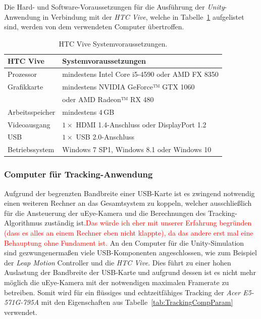 Die Hard- und Software-Voraussetzungen für die Ausführung der \textit{Unity}-Anwendung in Verbindung mit der \textit{HTC Vive}, welche in Tabelle~\ref{tab:viveReq} aufgelistet sind, werden von dem verwendeten Computer übertroffen.

\begin{table}
	\centering
	\begin{tabular}{|l|l|}
		\hline
		\Absatzbox{}
		\textbf{HTC Vive}& \textbf{Systemvoraussetzungen} \\
		\hline
		Prozessor & mindestens Intel Core i5-4590 oder AMD FX 8350\\
		\hline
		Grafikkarte & mindestens NVIDIA GeForce™ GTX 1060\\
		&oder AMD Radeon™ RX 480\\
		\hline
		Arbeitsspeicher & mindestens $4\,$GB\\		
		\hline
		Videoausgang & $1\times$ HDMI 1.4-Anschluss oder DisplayPort 1.2\\
		\hline
		USB & $1\times$ USB 2.0-Anschluss\\
		\hline
		Betriebssystem & Windows 7 SP1, Windows 8.1 oder Windows 10\\
		\hline
	\end{tabular}
	\caption{HTC Vive Systemvoraussetzungen. \cite{website:HTC_Vive_Ready}}
	\label{tab:viveReq}
\end{table}

\subsubsection{Computer für Tracking-Anwendung}\label{sec:TrackingComp}
Aufgrund der begrenzten Bandbreite einer USB-Karte ist es zwingend notwendig einen weiteren Rechner an das Gesamtsystem zu koppeln, welcher ausschließlich für die Ansteuerung der uEye-Kamera und die Berechnungen des Tracking-Algorithmus zuständig ist.\textcolor{red}{Das würde ich eher mit unserer Erfahrung begründen (dass es alles an einem Rechner eben nicht klappte), da das andere erst mal eine Behauptung ohne Fundament ist.}
An den Computer für die Unity-Simulation sind gezwungenermaßen viele USB-Komponenten angeschlossen, wie zum Beispiel der \textit{Leap Motion} Controller und die \textit{HTC Vive}. Dies führt zu einer hohen Auslastung der Bandbreite der USB-Karte und aufgrund dessen ist es nicht mehr möglich die uEye-Kamera mit der notwendigen maximalen Framerate zu betreiben. Somit wird für ein flüssiges und echtzeitfähiges Tracking der \textit{Acer E5-571G-795A} mit den Eigenschaften aus Tabelle~\ref{tab:TrackingCompParam} verwendet.

